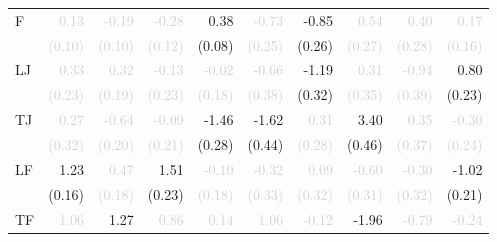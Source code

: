 \begin{tabular}{lrrrrrrrrr}
\multirow{2}{*}{F} &\textcolor{LightGray}{0.13} &\textcolor{LightGray}{-0.19} &\textcolor{LightGray}{-0.28} &\cellcolor{Gray}0.38 &\textcolor{LightGray}{-0.73} &-0.85 &\textcolor{LightGray}{0.54} &\textcolor{LightGray}{0.40} &\textcolor{LightGray}{0.17}\\
 &\textcolor{LightGray}{\tiny{(0.10)}} &\textcolor{LightGray}{\tiny{(0.10)}} &\textcolor{LightGray}{\tiny{(0.12)}} &\cellcolor{Gray}\tiny{(0.08)} &\textcolor{LightGray}{\tiny{(0.25)}} &\tiny{(0.26)} &\textcolor{LightGray}{\tiny{(0.27)}} &\textcolor{LightGray}{\tiny{(0.28)}} &\textcolor{LightGray}{\tiny{(0.16)}}\\[1ex]
\multirow{2}{*}{LJ} &\textcolor{LightGray}{0.33} &\textcolor{LightGray}{0.32} &\textcolor{LightGray}{-0.13} &\textcolor{LightGray}{-0.02} &\cellcolor{Gray}\textcolor{LightGray}{-0.66} &-1.19 &\textcolor{LightGray}{0.31} &\textcolor{LightGray}{-0.94} &0.80\\
 &\textcolor{LightGray}{\tiny{(0.23)}} &\textcolor{LightGray}{\tiny{(0.19)}} &\textcolor{LightGray}{\tiny{(0.23)}} &\textcolor{LightGray}{\tiny{(0.18)}} &\cellcolor{Gray}\textcolor{LightGray}{\tiny{(0.38)}} &\tiny{(0.32)} &\textcolor{LightGray}{\tiny{(0.35)}} &\textcolor{LightGray}{\tiny{(0.39)}} &\tiny{(0.23)}\\[1ex]
\multirow{2}{*}{TJ} &\textcolor{LightGray}{0.27} &\textcolor{LightGray}{-0.64} &\textcolor{LightGray}{-0.09} &-1.46 &-1.62 &\cellcolor{Gray}\textcolor{LightGray}{0.31} &3.40 &\textcolor{LightGray}{0.35} &\textcolor{LightGray}{-0.30}\\
 &\textcolor{LightGray}{\tiny{(0.32)}} &\textcolor{LightGray}{\tiny{(0.20)}} &\textcolor{LightGray}{\tiny{(0.21)}} &\tiny{(0.28)} &\tiny{(0.44)} &\cellcolor{Gray}\textcolor{LightGray}{\tiny{(0.28)}} &\tiny{(0.46)} &\textcolor{LightGray}{\tiny{(0.37)}} &\textcolor{LightGray}{\tiny{(0.24)}}\\[1ex]
\multirow{2}{*}{LF} &1.23 &\textcolor{LightGray}{0.47} &1.51 &\textcolor{LightGray}{-0.10} &\textcolor{LightGray}{-0.32} &\textcolor{LightGray}{0.09} &\cellcolor{Gray}\textcolor{LightGray}{-0.60} &\textcolor{LightGray}{-0.30} &-1.02\\
 &\tiny{(0.16)} &\textcolor{LightGray}{\tiny{(0.18)}} &\tiny{(0.23)} &\textcolor{LightGray}{\tiny{(0.18)}} &\textcolor{LightGray}{\tiny{(0.33)}} &\textcolor{LightGray}{\tiny{(0.32)}} &\cellcolor{Gray}\textcolor{LightGray}{\tiny{(0.31)}} &\textcolor{LightGray}{\tiny{(0.32)}} &\tiny{(0.21)}\\[1ex]
\multirow{2}{*}{TF} &\textcolor{LightGray}{1.06} &1.27 &\textcolor{LightGray}{0.86} &\textcolor{LightGray}{0.14} &\textcolor{LightGray}{1.06} &\textcolor{LightGray}{-0.12} &-1.96 &\cellcolor{Gray}\textcolor{LightGray}{-0.79} &\textcolor{LightGray}{-0.24}\\

\end{tabular}
